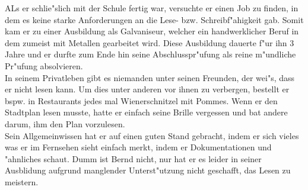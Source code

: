  ALs er schlie"slich mit der Schule fertig war, versuchte er einen Job zu finden, in dem es keine starke Anforderungen an die Lese- bzw. Schreibf"ahigkeit gab. Somit kam er zu einer Ausbildung als Galvaniseur, welcher ein handwerklicher Beruf in dem zumeist mit Metallen gearbeitet wird. Diese Ausbildung dauerte f"ur ihn 3 Jahre und er durfte zum Ende hin seine Abschlusspr"ufung als reine m"undliche Pr"ufung absolvieren.\\

In seinem Privatleben gibt es niemanden unter seinen Freunden, der wei"s, dass er nicht lesen kann. Um dies unter anderen vor ihnen zu verbergen, bestellt er bspw. in Restaurants jedes mal Wienerschnitzel mit Pommes. Wenn er den Stadtplan lesen musste, hatte er einfach seine Brille vergessen und bat andere darum, ihm den Plan vorzulesen.\\

Sein Allgemeinwissen hat er auf einen guten Stand gebracht, indem er sich vieles was er im Fernsehen sieht einfach merkt, indem er Dokumentationen und "ahnliches schaut. Dumm ist Bernd nicht, nur hat er es leider in seiner Ausblidung aufgrund manglender Unterst"utzung nicht geschafft, das Lesen zu meistern.

